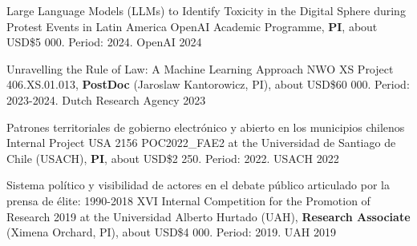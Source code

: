 \begin{cvhonors}
\cvhonor
{Large Language Models (LLMs) to Identify Toxicity in the Digital Sphere during Protest Events in Latin America}
{OpenAI Academic Programme, {\bfseries PI}, about USD\$5 000. Period: 2024.}
{OpenAI}
{2024}
\end{cvhonors}

\vspace{1mm}

\begin{cvhonors}
\cvhonor
{Unravelling the Rule of Law: A Machine Learning Approach}
{NWO XS Project 406.XS.01.013, {\bfseries PostDoc} (Jaroslaw Kantorowicz, PI), about USD\$60 000. Period: 2023-2024.} %
{Dutch Research Agency}
{2023}
\end{cvhonors}

\vspace{1mm}

\begin{cvhonors}
\cvhonor
{Patrones territoriales de gobierno electrónico y abierto en los municipios chilenos}
{Internal Project USA 2156 POC2022\_FAE2 at the Universidad de Santiago de Chile (USACH), {\bfseries PI}, about USD\$2 250. Period: 2022.} %
{USACH}
{2022}
\end{cvhonors}

\vspace{1mm}

\begin{cvhonors}
\cvhonor
{Sistema político y visibilidad de actores en el debate público articulado por la prensa de élite: 1990-2018}
{XVI Internal Competition for the Promotion of Research 2019 at the Universidad Alberto Hurtado (UAH), {\bfseries Research Associate} (Ximena Orchard, PI), about USD\$4 000. Period: 2019.} %
{UAH}
{2019}
\end{cvhonors}

\vspace{1mm}

